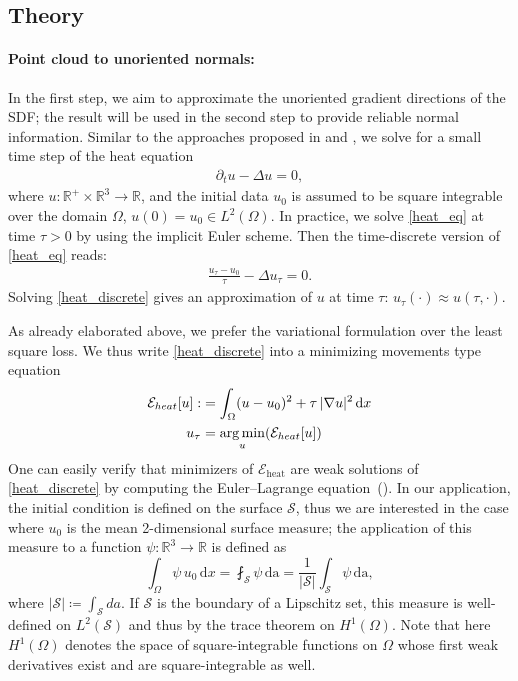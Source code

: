 \documentclass[12pt,openany]{book}
\newcommand{\R}{\mathbb{R}}
\def\S{\mathcal{S}}
\theoremstyle{plainnormal}
\theoremstyle{remark}
\DeclareMathOperator*{\argmin}{arg\,min}
\begin{document}
\subsection{Theory}
\paragraph{Point cloud to unoriented normals:}
In the first step, we aim to approximate the unoriented gradient directions of the SDF; the result will be used in the second step to provide reliable normal information. Similar to the approaches proposed in \cite{Crane_2013} and \cite{FengCrane}, we solve for a small time step of the heat equation 
\begin{align}
\partial_t u - \Delta u = 0 \label{heat_eq},
\end{align} where $u: \R^+ \times \R^3 \rightarrow \R$, and the initial data $u_0$ is assumed to be square integrable over the domain $\Omega$, $u(0) = u_0 \in L^2(\Omega)$. In practice, we solve \cref{heat_eq} at time $\tau > 0$ by using the implicit Euler scheme. Then the time-discrete version of \cref{heat_eq} reads: 
\begin{align}\label{heat_discrete}
    \frac{u_\tau - u_0}{\tau} - \Delta u_\tau = 0.
\end{align}
Solving \cref{heat_discrete} gives an approximation of $u$ at time $\tau$: $u_\tau(\cdot) \approx u(\tau,\cdot)$.\par
As already elaborated above, we prefer the variational formulation over the least square loss. We thus write \cref{heat_discrete} into a minimizing movements type equation
\begin{align}\label{loss_heat}
    \mathcal{E}_{heat}[u] :&= \int_\Omega (u - u_0)^2 + \tau\, |\nabla u|^2 \,\mathrm{d}x \\
    u_\tau &= \argmin_u (\mathcal{E}_{heat}[u])\notag
\end{align}
One can easily verify that minimizers of $\mathcal{E}_{\mathrm{heat}}$ are weak solutions of \cref{heat_discrete} by computing the Euler–Lagrange equation~().
In our application, the initial condition is defined on the surface $\S$, thus we are interested in the case where $u_0$ is the mean 2-dimensional surface measure; the application of this measure to a function $\psi: \R^3 \rightarrow\R$ is defined as$$\int_\Omega \psi \,u_0 \,\mathrm{d}x =\fint_\S \psi\,\mathrm{da} = \frac{1}{|\mathcal{S}|} \int_\mathcal{S} \psi \,\mathrm{da},$$
where $|\mathcal{S}| \coloneqq \int_\S da$.
If $\S$ is the boundary of a Lipschitz set, this measure is well-defined on $L^2(\S)$ and thus by the trace theorem on $H^1(\Omega)$. Note that here $H^1(\Omega)$ denotes the space of square-integrable functions on $\Omega$ whose first weak derivatives exist and are square-integrable as well. 
\end{document}

